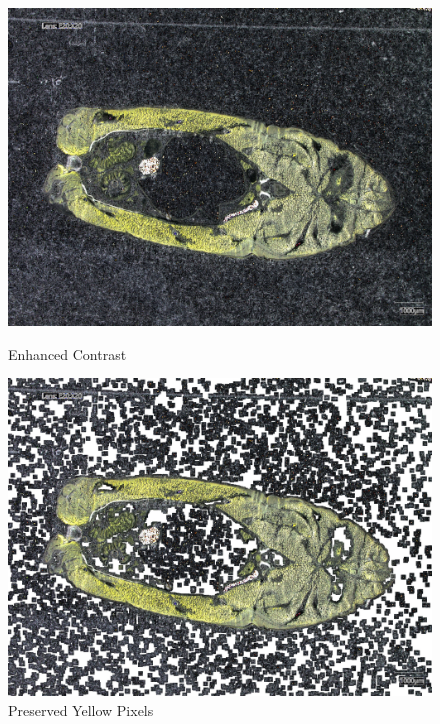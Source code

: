\begin{figure}[H]
    \centering
    \begin{minipage}{0.45\textwidth}
        \centering
        \includegraphics[width=\textwidth]{./fig/threshold/enhanced_image.jpg}
        \caption{Enhanced Contrast}
        \label{fig:enhanced_image}
    \end{minipage}
    \begin{minipage}{0.45\textwidth}
        \centering
        \includegraphics[width=\textwidth]{./fig/threshold/yellowpic.jpg}
        \caption{Preserved Yellow Pixels}
        \label{fig:yellowpic}
    \end{minipage}
\end{figure}

